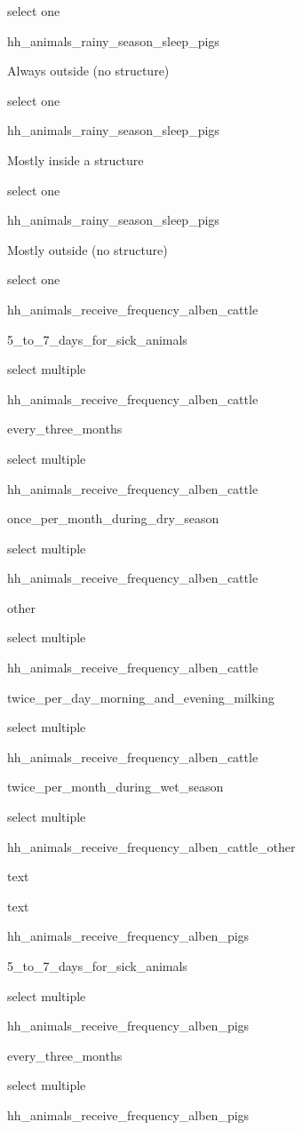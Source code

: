 \documentclass[]{article}
\begin{document}
select one

hh\_animals\_rainy\_season\_sleep\_pigs

Always outside (no structure)

select one

hh\_animals\_rainy\_season\_sleep\_pigs

Mostly inside a structure

select one

hh\_animals\_rainy\_season\_sleep\_pigs

Mostly outside (no structure)

select one

hh\_animals\_receive\_frequency\_alben\_cattle

5\_to\_7\_days\_for\_sick\_animals

select multiple

hh\_animals\_receive\_frequency\_alben\_cattle

every\_three\_months

select multiple

hh\_animals\_receive\_frequency\_alben\_cattle

once\_per\_month\_during\_dry\_season

select multiple

hh\_animals\_receive\_frequency\_alben\_cattle

other

select multiple

hh\_animals\_receive\_frequency\_alben\_cattle

twice\_per\_day\_morning\_and\_evening\_milking

select multiple

hh\_animals\_receive\_frequency\_alben\_cattle

twice\_per\_month\_during\_wet\_season

select multiple

hh\_animals\_receive\_frequency\_alben\_cattle\_other

text

text

hh\_animals\_receive\_frequency\_alben\_pigs

5\_to\_7\_days\_for\_sick\_animals

select multiple

hh\_animals\_receive\_frequency\_alben\_pigs

every\_three\_months

select multiple

hh\_animals\_receive\_frequency\_alben\_pigs
\end{document}
